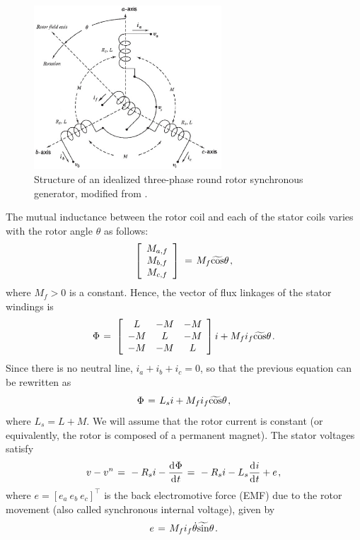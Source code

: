 \documentclass[letterpaper, 10 pt, conference]{ieeeconf}
\newcommand{\BE}{\begin{equation}}
\newcommand{\BEQ}[1]{\BE\label{#1}} %
\newcommand{\m}      {{\hbox{\hskip 1pt}}}
\newcommand{\dd}     {{\rm d\hbox{\hskip 0.5pt}}}
\begin{document}
\begin{figure} %
\centering \includegraphics[width=7cm]{SGStructure.eps}
\caption[Structure of an idealized three-phase round rotor synchronous
generator]{Structure of an idealized three-phase round rotor
synchronous generator, modified from \cite[Figure 3.4]{GrSt2014}.}
\label{fig:structOfSG} \vspace{-3mm}
\end{figure}

The mutual inductance between the rotor coil and each of the stator
coils varies with the rotor angle $\theta$ as follows:
$$ \left[\begin{array}{c} M_{a,f}\\ M_{b,f}\\ M_{c,f}\end{array}
   \right] \m=\m M_{f}\widetilde{\cos}\theta \m,$$
where $M_f>0$ is a constant. Hence, the vector of flux linkages of the
stator windings is
$$ \Phi \m=\m \left[\begin{array}{ccc} L & -M & -M\\ -M & L & -M\\
   -M & -M & L \end{array}\right]i + M_f i_f\widetilde{\cos}\theta
   \m.$$
Since there is no neutral line, $i_a+i_b+i_c=0$, so that the previous
equation can be rewritten as 
$$\Phi \m=\m L_s i + M_f i_f \widetilde{\cos}\theta \m,$$
where $L_s=L+M$. We will assume that the rotor current is constant
(or equivalently, the rotor is composed of a permanent magnet). The
stator voltages satisfy
\BEQ{eq:SGTerminalVlotage}
   v - v^n \m=\m -R_{s}i-\frac{\dd\Phi}{\dd t} \m=\m -R_{s}i-L_{s}
   \frac{\dd i}{\dd t} + e \m,
\end{equation}
where $e=\left[e_a\ e_b\ e_c \right] ^\top$ is the back electromotive 
force (EMF) due to the rotor movement (also called synchronous 
internal voltage), given by \vspace{-2mm}
\BEQ{eq:emf}
   e \m=\m M_f i_f\dot{\theta}\widetilde{\sin}\theta \m.
\end{equation}
\end{document}
